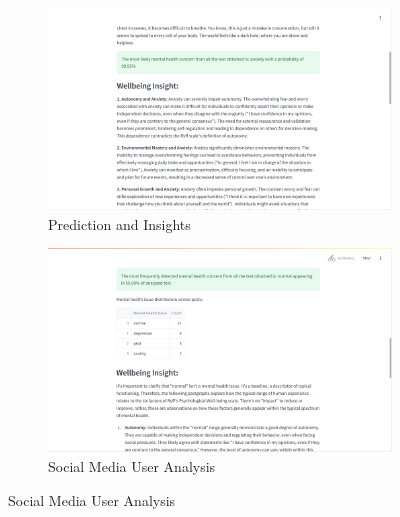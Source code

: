 \begin{figure}[h!]
    \centering
    \begin{subfigure}[b]{0.495\textwidth}
        \centering
        \includegraphics[width=\textwidth]{App Images/03 Interface.png}
        \caption*{Prediction and Insights}
        \label{fig:03i}
    \end{subfigure}
    \hfill
    \begin{subfigure}[b]{0.495\textwidth}
        \centering
        \includegraphics[width=\textwidth]{App Images/07 Interface.png}
        \caption*{Social Media User Analysis}
        \label{fig:08i}
    \end{subfigure}
    \label{fig:combined_analysis}
\end{figure}

\vspace{-2em}

